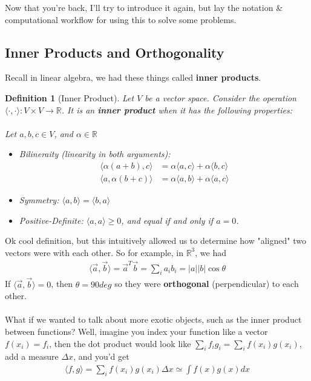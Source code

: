 \documentclass[12pt,fleqn]{article}
\numberwithin{equation}{section} %
\newtheorem{definition}{Definition}
\newcounter{problem}
\begin{document}
Now that you're back, I'll try to introduce it again, but lay the notation \& computational workflow for using this to solve some problems.

\subsection{Inner Products and Orthogonality}
Recall in linear algebra, we had these things called \textbf{inner products}. 
\begin{definition}
	[Inner Product] Let $V$ be a vector space. Consider the operation $\langle \cdot, \cdot \rangle : V \times V \to \mathbb R$. It is an \textbf{inner product} when it has the following properties:
	\\
	\\
	Let $a,b,c \in V$, and $\alpha \in \mathbb R$
	\begin{itemize}
		\item Bilineraity (linearity in both arguments): 
		\begin{align}
			\langle \alpha (a + b) , c\rangle & = \alpha \langle a, c\rangle  + \alpha \langle b , c\rangle\\
			\langle a, \alpha (b + c)\rangle &  = \alpha \langle a, b\rangle + \alpha \langle a, c\rangle
		\end{align}  
		\item Symmetry: $\langle a, b\rangle = \langle b, a\rangle$
		\item Positive-Definite: $\langle a, a\rangle \geq 0$, and equal if and only if $a=0$.
	\end{itemize}
\end{definition}
Ok cool definition, but this intuitively allowed us to determine how "aligned" two vectors were with each other. So for example, in $\mathbb R^3$, we had
\begin{align}
	\langle \vec a, \vec b\rangle = \vec a^T \vec b =  \sum_i a_i b_i =|a||b| \cos \theta
\end{align}
If $\langle \vec a , \vec b\rangle = 0$, then $\theta = 90 deg$ so they were \textbf{orthogonal} (perpendicular) to each other.\\
\\
What if we wanted to talk about more exotic objects, such as the inner product between functions? Well, imagine you index your function like a vector $f(x_i) = f_i$, then the dot product would look like $\sum_i f_i g_i = \sum_i f(x_i ) g(x_i)$, add a measure $\Delta x$, and you'd get
\begin{align}
	\langle f, g\rangle = \sum_i f(x_i) g(x_i) \Delta x \simeq \int f(x) g(x) dx
\end{align}
\end{document}
